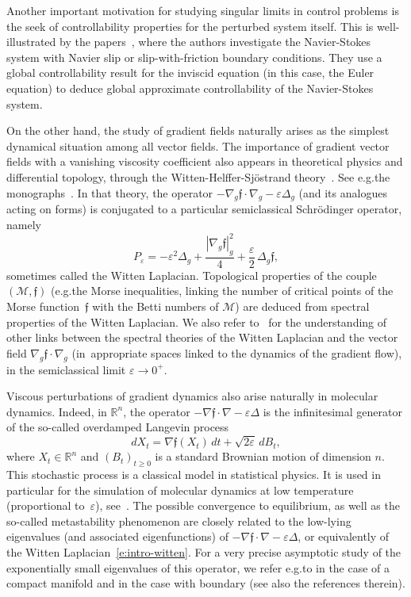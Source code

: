 \documentclass[10pt]{amsart}
\theoremstyle{definition}
\newcommand{\M}{\ensuremath{\mathcal M}}
\newcommand{\mb}[1]{\ensuremath{\mathbb{#1}}}
\newcommand{\R}{{\mb{R}}}
\newcommand{\f}{\ensuremath{\mathfrak{f}}}
\let\eps\varepsilon
\providecommand{\eg}{e.g.}\providecommand{\ie}{i.e.}\providecommand{\etc}{etc.}
\begin{document}
Another important motivation for studying singular limits in control problems is the seek of controllability properties for the perturbed system itself. This is well-illustrated by the papers~\cite{Cor:96,CF:96,ChaNavier:09,CMS:19}, where the authors investigate the Navier-Stokes system with Navier slip or slip-with-friction boundary conditions. They use a global controllability result for the inviscid equation (in this case, the Euler equation) to deduce global approximate controllability of the Navier-Stokes system.

On the other hand, the study of gradient fields naturally arises as the simplest dynamical situation among all vector fields.
The importance of gradient vector fields with a vanishing viscosity coefficient also appears in theoretical physics and differential topology, through the Witten-Helffer-Sjöstrand theory~\cite{Witten:82,HS:85}. See \eg the monographs~\cite{Helffer:booksemiclassic,CFKS}.
In that theory, the operator $- \nabla_g \f \cdot \nabla_g - \eps \Delta_g$ (and its analogues acting on forms) is conjugated to a particular semiclassical Schrödinger operator, namely
\begin{equation}
\label{e:intro-witten}
P_\eps = -\eps^2 \Delta_g + \frac{|\nabla_g \f|_g^2}{4} + \frac{\eps}{2}\, \Delta_g \f,
\end{equation}
sometimes called the Witten Laplacian.
Topological properties of the couple $(\M,\f)$ (\eg the Morse inequalities, linking the number of critical points of the Morse function~$\f$ with the Betti numbers of $\M$) are deduced from spectral properties of the Witten Laplacian.
We also refer to~\cite{DR:20} for the understanding of other links between the spectral theories of the Witten Laplacian and the vector field $\nabla_g \f \cdot \nabla_g$ (in~appropriate spaces linked to the dynamics of the gradient flow), in the semiclassical limit $\eps\to 0^+$.

Viscous perturbations of gradient dynamics also arise naturally in molecular dynamics.
Indeed, in $\R^n$, the operator $- \nabla \f \cdot \nabla - \eps \Delta$ is the infinitesimal generator of the so-called overdamped Langevin process
\[
dX_t = \nabla \f(X_t)\, dt + \sqrt{2\eps}\, dB_t,
\]
where $X_t\in \R^n$ and $(B_t)_{t\geq0}$ is a standard Brownian motion of dimension $n$. This stochastic process is a classical model in statistical physics. It is used in particular for the simulation of molecular dynamics at low temperature (proportional to~$\eps$), see~\cite{Chan:43,SM:79}. The possible convergence to equilibrium, as well as the so-called metastability phenomenon are closely related to the low-lying eigenvalues (and associated eigenfunctions) of $- \nabla \f \cdot \nabla - \eps \Delta$, or equivalently of the Witten Laplacian~\eqref{e:intro-witten}.
For a very precise asymptotic study of the exponentially small eigenvalues of this operator, we refer \eg to \cite{HKN:04,Michel:19} in the case of a compact manifold and \cite{HN:06,LePeutrec:10,DLLN:19} in the case with boundary (see also the references therein).
\end{document}
